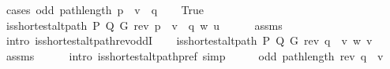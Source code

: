 \begin{isabellebody}
\endisataginvisible
{\isafoldinvisible}%
%
\isadeliminvisible
\isanewline
%
\endisadeliminvisible
%
\isadelimproof
%
\endisadelimproof
%
\isatagproof
{}\isamarkupfalse%
\ {\isacharparenleft}{\kern0pt}cases\ {\isachardoublequoteopen}odd\ {\isacharparenleft}{\kern0pt}path{\isacharunderscore}{\kern0pt}length\ {\isacharparenleft}{\kern0pt}p\ {\isacharat}{\kern0pt}\ v\ {\isacharhash}{\kern0pt}\ q{\isacharparenright}{\kern0pt}{\isacharparenright}{\kern0pt}{\isachardoublequoteclose}{\isacharparenright}{\kern0pt}\isanewline
\ \ \isamarkupfalse%
\ True\isanewline
\ \ \isamarkupfalse%
\ {\isachardoublequoteopen}is{\isacharunderscore}{\kern0pt}shortest{\isacharunderscore}{\kern0pt}alt{\isacharunderscore}{\kern0pt}path\ P\ Q\ G\ {\isacharparenleft}{\kern0pt}rev\ {\isacharparenleft}{\kern0pt}p\ {\isacharat}{\kern0pt}\ v\ {\isacharhash}{\kern0pt}\ q{\isacharparenright}{\kern0pt}{\isacharparenright}{\kern0pt}\ w\ u{\isachardoublequoteclose}\isanewline
\ \ \ \ \isamarkupfalse%
\ assms{\isacharparenleft}{\kern0pt}{}{\isacharcomma}{\kern0pt}\ {}{\isacharparenright}{\kern0pt}\isanewline
\ \ \ \ \isamarkupfalse%
\ {\isacharparenleft}{\kern0pt}intro\ is{\isacharunderscore}{\kern0pt}shortest{\isacharunderscore}{\kern0pt}alt{\isacharunderscore}{\kern0pt}path{\isacharunderscore}{\kern0pt}rev{\isacharunderscore}{\kern0pt}oddI{\isacharparenright}{\kern0pt}\isanewline
\ \ \isamarkupfalse%
\ {\isachardoublequoteopen}is{\isacharunderscore}{\kern0pt}shortest{\isacharunderscore}{\kern0pt}alt{\isacharunderscore}{\kern0pt}path\ P\ Q\ G\ {\isacharparenleft}{\kern0pt}rev\ q\ {\isacharat}{\kern0pt}\ {\isacharbrackleft}{\kern0pt}v{\isacharbrackright}{\kern0pt}{\isacharparenright}{\kern0pt}\ w\ v{\isachardoublequoteclose}\isanewline
\ \ \ \ \isamarkupfalse%
\ assms{\isacharparenleft}{\kern0pt}{}{\isacharparenright}{\kern0pt}\isanewline
\ \ \ \ \isamarkupfalse%
\ {\isacharparenleft}{\kern0pt}intro\ is{\isacharunderscore}{\kern0pt}shortest{\isacharunderscore}{\kern0pt}alt{\isacharunderscore}{\kern0pt}path{\isacharunderscore}{\kern0pt}pref{\isacharparenright}{\kern0pt}\ simp\isanewline
\ \ \isamarkupfalse%
\ \isamarkupfalse%
\ {\isachardoublequoteopen}odd\ {\isacharparenleft}{\kern0pt}path{\isacharunderscore}{\kern0pt}length\ {\isacharparenleft}{\kern0pt}rev\ q\ {\isacharat}{\kern0pt}\ {\isacharbrackleft}{\kern0pt}v{\isacharbrackright}{\kern0pt}{\isacharparenright}{\kern0pt}{\isacharparenright}{\kern0pt}{\isachardoublequoteclose}\isanewline

\end{isabellebody}
